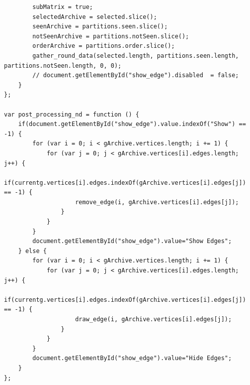 \documentclass[12pt, twoside,a4paper,toc=bibliography]{scrbook}
\begin{document}
\begin{lstlisting}
        subMatrix = true;
        selectedArchive = selected.slice();
        seenArchive = partitions.seen.slice();
        notSeenArchive = partitions.notSeen.slice();
        orderArchive = partitions.order.slice();
        gather_round_data(selected.length, partitions.seen.length, partitions.notSeen.length, 0, 0);
        // document.getElementById("show_edge").disabled  = false;
    }
};

var post_processing_nd = function () {
    if(document.getElementById("show_edge").value.indexOf("Show") == -1) {
        for (var i = 0; i < gArchive.vertices.length; i += 1) {
            for (var j = 0; j < gArchive.vertices[i].edges.length; j++) {
                if(currentg.vertices[i].edges.indexOf(gArchive.vertices[i].edges[j]) == -1) {
                    remove_edge(i, gArchive.vertices[i].edges[j]);
                }
            }
        }
        document.getElementById("show_edge").value="Show Edges";
    } else {
        for (var i = 0; i < gArchive.vertices.length; i += 1) {
            for (var j = 0; j < gArchive.vertices[i].edges.length; j++) {
                if(currentg.vertices[i].edges.indexOf(gArchive.vertices[i].edges[j]) == -1) {
                    draw_edge(i, gArchive.vertices[i].edges[j]);
                }
            }
        }
        document.getElementById("show_edge").value="Hide Edges";
    }
};
\end{lstlisting}
\end{document}
